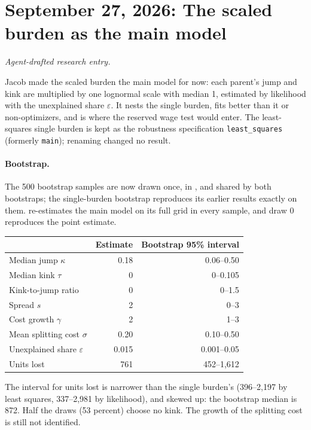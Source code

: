 \clearpage
\section*{September 27, 2026: The scaled burden as the main model}
\textit{Agent-drafted research entry.}

Jacob made the scaled burden the main model for now: each parent's jump and
kink are multiplied by one lognormal scale with median 1, estimated by
likelihood with the unexplained share $\varepsilon$. It nests the single burden,
fits better than it or non-optimizers, and is where the reserved wage test
would enter. The least-squares single burden is kept as the robustness
specification \texttt{least\_squares} (formerly \texttt{main}); renaming
changed no result.

\paragraph{Bootstrap.} The 500 bootstrap samples are now drawn once, in
, and shared by both bootstraps; the
single-burden bootstrap reproduces its earlier results exactly on them.
 re-estimates the main model on its full grid
in every sample, and draw 0 reproduces the point estimate.

\begin{center}
\small
\begin{tabular}{lrr}
\hline
 & Estimate & Bootstrap 95\% interval \\
\hline
Median jump $\kappa$ & 0.18 & 0.06--0.50 \\
Median kink $\tau$ & 0 & 0--0.105 \\
Kink-to-jump ratio & 0 & 0--1.5 \\
Spread $s$ & 2 & 0--3 \\
Cost growth $\gamma$ & 2 & 1--3 \\
Mean splitting cost $\sigma$ & 0.20 & 0.10--0.50 \\
Unexplained share $\varepsilon$ & 0.015 & 0.001--0.05 \\
Units lost & 761 & 452--1,612 \\
\hline
\end{tabular}
\end{center}

The interval for units lost is narrower than the single burden's (396--2,197
by least squares, 337--2,981 by likelihood), and skewed up: the bootstrap
median is 872. Half the draws (53 percent) choose no kink. The growth of the
splitting cost is still not identified.

